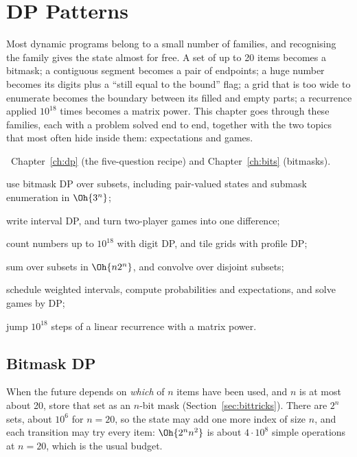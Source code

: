 \chapter{DP Patterns}\label{ch:dppatterns}

Most dynamic programs belong to a small number of families, and recognising the family gives the state almost for free. A set of
up to 20 items becomes a bitmask; a contiguous segment becomes a pair of endpoints; a huge number becomes its digits plus a
``still equal to the bound'' flag; a grid that is too wide to enumerate becomes the boundary between its filled and empty parts;
a recurrence applied $10^{18}$ times becomes a matrix power. This chapter goes through these families, each with a problem solved
end to end, together with the two topics that most often hide inside them: expectations and games.

\begin{chapterintro}{\gold\ \plat}{Chapter~\ref{ch:dp} (the five-question recipe) and Chapter~\ref{ch:bits} (bitmasks).}
  \item use bitmask DP over subsets, including pair-valued states and submask enumeration in $\Oh{3^n}$;
  \item write interval DP, and turn two-player games into one difference;
  \item count numbers up to $10^{18}$ with digit DP, and tile grids with profile DP;
  \item sum over subsets in $\Oh{n 2^n}$, and convolve over disjoint subsets;
  \item schedule weighted intervals, compute probabilities and expectations, and solve games by DP;
  \item jump $10^{18}$ steps of a linear recurrence with a matrix power.
\end{chapterintro}

\section[Bitmask DP]{Bitmask DP \hfill \gold}\label{sec:bitmaskdp}

When the future depends on \emph{which} of $n$ items have been used, and $n$ is at most about 20, store that set as an $n$-bit mask
(Section~\ref{sec:bittricks}). There are $2^n$ sets, about $10^6$ for $n = 20$, so the state may add one more index of size $n$, and
each transition may try every item: $\Oh{2^n n^2}$ is about $4 \cdot 10^8$ simple operations at $n = 20$, which is the usual
budget.

